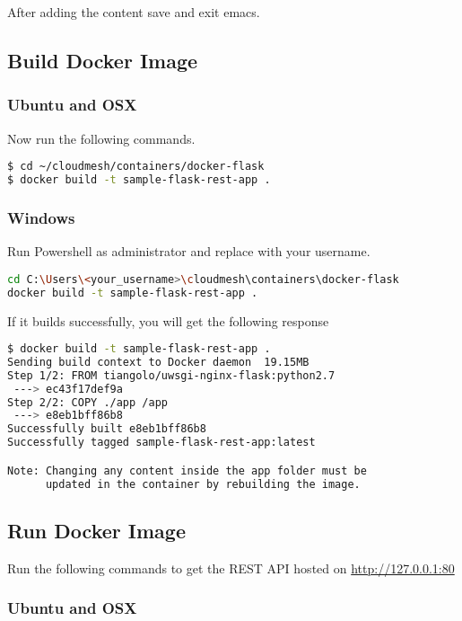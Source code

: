 After adding the content save and exit emacs.

\subsection{Build Docker Image}

\subsubsection{Ubuntu and OSX}

Now run the following commands.

\begin{lstlisting}[language=bash]
$ cd ~/cloudmesh/containers/docker-flask
$ docker build -t sample-flask-rest-app .
\end{lstlisting}

\subsubsection{Windows}

Run Powershell as administrator and replace with your username.

\begin{lstlisting}[language=bash]
cd C:\Users\<your_username>\cloudmesh\containers\docker-flask
docker build -t sample-flask-rest-app .
\end{lstlisting}

If it builds successfully, you will get the following response

\begin{lstlisting}[language=bash]
$ docker build -t sample-flask-rest-app .
Sending build context to Docker daemon  19.15MB
Step 1/2: FROM tiangolo/uwsgi-nginx-flask:python2.7
 ---> ec43f17def9a
Step 2/2: COPY ./app /app
 ---> e8eb1bff86b8
Successfully built e8eb1bff86b8
Successfully tagged sample-flask-rest-app:latest

Note: Changing any content inside the app folder must be
      updated in the container by rebuilding the image.
\end{lstlisting}

\subsection{Run Docker Image}

Run the following commands to get the REST API hosted on
\url{http://127.0.0.1:80}

\subsubsection{Ubuntu and OSX}

